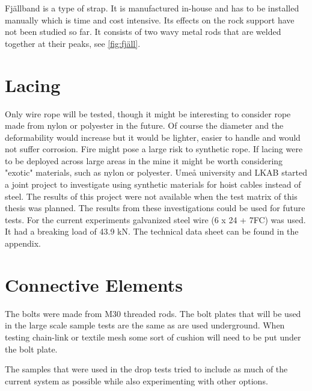 Fjällband is a type of strap. It is manufactured in-house and has to be installed manually which is time and cost intensive. Its effects on the rock support have not been studied so far. It consists of two wavy metal rods that are welded together at their peaks, see \autoref{fig:fjäll}.  %

\section*{Lacing}
Only wire rope will be tested, though it might be interesting to consider rope made from nylon or polyester in the future. Of course the diameter and the deformability would increase but it would be lighter, easier to handle and would not suffer corrosion. Fire might pose a large risk to synthetic rope. If lacing were to be deployed across large areas in the mine it might be worth considering "exotic" materials, such as nylon or polyester. Umeå university and LKAB started  a joint project to investigate using synthetic materials for hoist cables instead of steel. The results of this project were not available when the test matrix of this thesis was planned.
The results from these investigations could be used for future tests. %
For the current experiments galvanized steel wire (6 x 24 + 7FC) was used. It had a breaking load of 43.9 kN. The technical data sheet can be found in the appendix.

\section*{Connective Elements}
The bolts were made from M30 threaded rods. The bolt plates that will be used in the large scale sample tests are the same as are used underground.
When testing chain-link or textile mesh some sort of cushion will need to be put under the bolt plate.

The samples that were used in the drop tests tried to include as much of the current system as possible while also experimenting with other options.